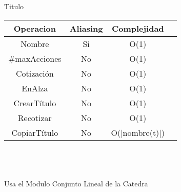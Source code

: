 {\LARGE Titulo} \\

\begin{tabular}[c]{|c|c|c|c|}
	
	\hline
		Operacion & Aliasing & Complejidad \\
		\hline
		Nombre & Si & O(1)  \\
		\hline
		\#maxAcciones & No & O(1) \\
		\hline
		Cotizaci\'on & No & O(1)\\
		\hline
		EnAlza & No & O(1)\\
		\hline
		CrearT\'itulo & No & O(1)\\
		\hline
		Recotizar & No & O(1)\\
		\hline
		CopiarT\'itulo & No & O(|nombre(t)|)\\
		\hline
	\end{tabular}\\\\
	\\
Usa el Modulo {\LARGE Conjunto Lineal} de la Catedra \\
\newpage